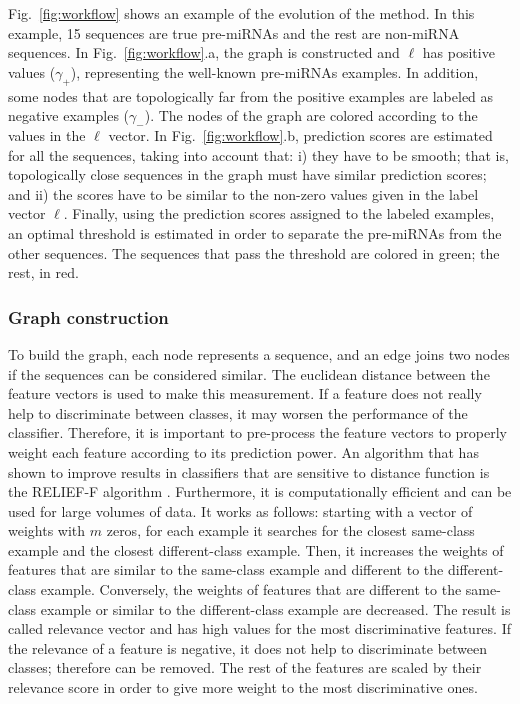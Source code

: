 \documentclass{article}
\newcommand*\Bell{\ensuremath{\boldsymbol\ell}}
\begin{document}
Fig.~\ref{fig:workflow} shows an example of the evolution of the method. In this example, 15 sequences are true pre-miRNAs and the rest are non-miRNA sequences. In Fig.~\ref{fig:workflow}.a, the graph is constructed and $\Bell$ has positive values ($\gamma_{+}$), representing the well-known pre-miRNAs examples. In addition, some nodes that are topologically far from the positive examples are labeled as negative examples ($\gamma_{-}$). The nodes of the graph are colored according to the values in the $\Bell$ vector. In  Fig.~\ref{fig:workflow}.b, prediction scores are estimated for all the sequences, taking into account that: i) they have to be smooth; that is, topologically close sequences in the graph must have similar prediction scores; and ii) the scores have to be similar to the non-zero values given in the label vector $\Bell$. Finally, using the prediction scores assigned to the labeled examples, an optimal threshold is estimated in order to separate the pre-miRNAs from the other sequences. The sequences that pass the threshold are colored in green; the rest, in red.

\subsubsection{Graph construction}
To build the graph, each node represents a sequence, and an edge joins two nodes if the sequences can be considered similar. The euclidean distance between the feature vectors is used to make this measurement. If a feature does not really help to discriminate between classes, it may worsen the performance of the classifier. Therefore, it is important to pre-process the feature vectors to properly weight each feature according to its prediction power. An algorithm that has shown to improve results in classifiers that are sensitive to distance function is the RELIEF-F algorithm \citep{kononenko1994estimating, wettschereck1997review}. Furthermore, it is computationally efficient and can be used for large volumes of data. 
It  works as follows: starting with a vector of weights with $m$ zeros, for each example it searches for the closest same-class example and the closest different-class example. Then, it increases the weights of features that are similar to the same-class example and different to the different-class example. Conversely, the weights of features that are different to the same-class example or similar to the different-class example are decreased. The result is called relevance vector and has high values for the most discriminative features. If the relevance of a feature is negative, it does not help to discriminate between classes; therefore can be removed. The rest of the features are scaled by their relevance score in order to give more weight to the most discriminative ones.
\end{document}
